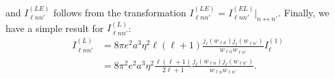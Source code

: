 and $I_{\ell nn'}^{(LE)}$ follows from the transformation $I_{\ell nn'}^{(LE)} = I_{\ell nn'}^{(EL)}|_{n\leftrightarrow n'}$. Finally, we have a simple result for $I_{\ell nn'}^{(L)}$:
\begin{equation}
\begin{split}
I_{\ell nn'}^{(L)} &= 8\pi e^2a^3\eta^2\ell(\ell + 1)\frac{j_{\ell}(w_{\ell n})j_\ell(w_{\ell n'})}{w_{\ell n}w_{\ell n'}}I_\ell^{(1)}\\
&= 8\pi^2e^2a^3\eta^2\frac{\ell(\ell + 1)}{2\ell + 1}\frac{j_\ell(w_{\ell n})j_\ell(w_{\ell n'})}{w_{\ell n}w_{\ell n'}}.
\end{split}
\end{equation}





